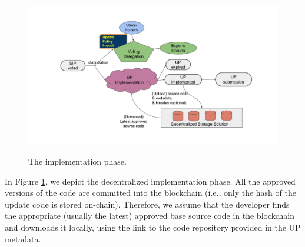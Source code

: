 \begin{figure}[h!] %
    \caption{The implementation phase.}
    \centering
    \includegraphics[width=1.0 \columnwidth,keepaspectratio]{figures/implementation_phase.pdf}
    \label{implementation}
\end{figure}


In Figure \ref{implementation}, we depict the decentralized implementation phase. All the approved versions of the code are committed into the blockchain (i.e., only the hash of the update code is stored on-chain). Therefore, we assume that the developer finds the appropriate (usually the latest) approved base source code in the blockchain and downloads it locally, using the link to the %
 code repository provided in the UP metadata. %

